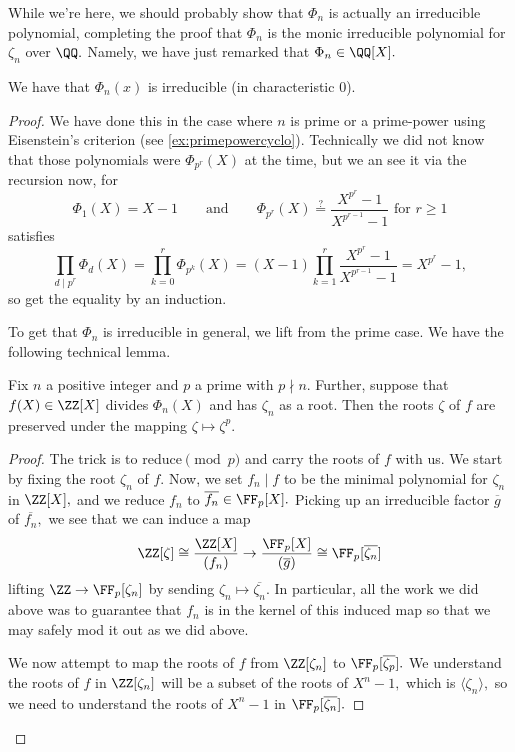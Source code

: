 While we're here, we should probably show that $\Phi_n$ is actually an irreducible polynomial, completing the proof that $\Phi_n$ is the monic irreducible polynomial for $\zeta_n$ over $\QQ.$ Namely, we have just remarked that $\Phi_n\in\QQ[X].$
\begin{proposition}
	We have that $\Phi_n(x)$ is irreducible (in characteristic $0$).
\end{proposition}
\begin{proof}
	We have done this in the case where $n$ is prime or a prime-power using Eisenstein's criterion (see \autoref{ex:primepowercyclo}). Technically we did not know that those polynomials were $\Phi_{p^r}(X)$ at the time, but we an see it via the recursion now, for
	\[\Phi_1(X)=X-1\qquad\text{and}\qquad\Phi_{p^r}(X)\stackrel?=\frac{X^{p^r}-1}{X^{p^{r-1}}-1}\text{  for  }r\ge1\]
	satisfies
	\[\prod_{d\mid p^r}\Phi_d(X)=\prod_{k=0}^r\Phi_{p^k}(X)=(X-1)\prod_{k=1}^r\frac{X^{p^r}-1}{X^{p^{r-1}}-1}=X^{p^r}-1,\]
	so get the equality by an induction.

	To get that $\Phi_n$ is irreducible in general, we lift from the prime case. We have the following technical lemma.
	\begin{lemma} \label{lem:embedroots}
		Fix $n$ a positive integer and $p$ a prime with $p\nmid n.$ Further, suppose that $f(X)\in\ZZ[X]$ divides $\Phi_n(X)$ and has $\zeta_n$ as a root. Then the roots $\zeta$ of $f$ are preserved under the mapping $\zeta\mapsto\zeta^p.$
	\end{lemma}
	\begin{proof}
		The trick is to reduce$\pmod p$ and carry the roots of $f$ with us. We start by fixing the root $\zeta_n$ of $f.$ Now, we set $f_n\mid f$ to be the minimal polynomial for $\zeta_n$ in $\ZZ[X],$
		and we reduce $f_n$ to $\overline{f_n}\in\FF_p[X].$ Picking up an irreducible factor $\overline g$ of $\overline{f_n},$ we see that we can induce a map
		\[\ZZ[\zeta]\cong\frac{\ZZ[X]}{(f_n)}\to\frac{\FF_p[X]}{(\overline g)}\cong\FF_p[\overline{\zeta_n}]\]
		lifting $\ZZ\to\FF_p[\zeta_n]$ by sending $\zeta_n\mapsto\overline{\zeta_n}.$ In particular, all the work we did above was to guarantee that $f_n$ is in the kernel of this induced map so that we may safely mod it out as we did above.
		
		We now attempt to map the roots of $f$ from $\ZZ[\zeta_n]$ to $\FF_p[\overline{\zeta_p}].$ We understand the roots of $f$ in $\ZZ[\zeta_n]$ will be a subset of the roots of $X^n-1,$ which is $\langle\zeta_n\rangle,$ so we need to understand the roots of $X^n-1$ in $\FF_p[\overline{\zeta_n}].$
		

\end{proof}
\end{proof}
